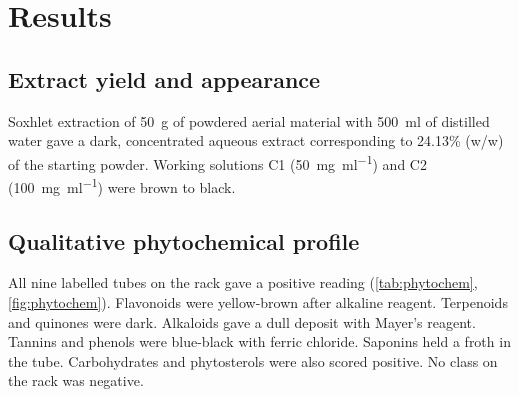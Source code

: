 
\chapter{Results}\label{ch:results}

\section{Extract yield and appearance}

Soxhlet extraction of \SI{50}{\gram} of powdered aerial material with \SI{500}{\milli\litre} of distilled water gave a dark, concentrated aqueous extract corresponding to 24.13\% (w/w) of the starting powder. Working solutions C1 (\SI{50}{\milli\gram\per\milli\litre}) and C2 (\SI{100}{\milli\gram\per\milli\litre}) were brown to black.

\section{Qualitative phytochemical profile}

All nine labelled tubes on the rack gave a positive reading (\cref{tab:phytochem}, \cref{fig:phytochem}). Flavonoids were yellow-brown after alkaline reagent. Terpenoids and quinones were dark. Alkaloids gave a dull deposit with Mayer's reagent. Tannins and phenols were blue-black with ferric chloride. Saponins held a froth in the tube. Carbohydrates and phytosterols were also scored positive. No class on the rack was negative.

